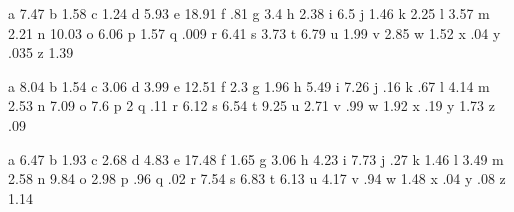 


\startcharactertable[nl]
  \charfreq a  7.47
  \charfreq b  1.58
  \charfreq c  1.24
  \charfreq d  5.93
  \charfreq e 18.91
  \charfreq f   .81
  \charfreq g  3.4
  \charfreq h  2.38
  \charfreq i  6.5
  \charfreq j  1.46
  \charfreq k  2.25
  \charfreq l  3.57
  \charfreq m  2.21
  \charfreq n 10.03
  \charfreq o  6.06
  \charfreq p  1.57
  \charfreq q   .009
  \charfreq r  6.41
  \charfreq s  3.73
  \charfreq t  6.79
  \charfreq u  1.99
  \charfreq v  2.85
  \charfreq w  1.52
  \charfreq x   .04
  \charfreq y   .035
  \charfreq z  1.39
\stopcharactertable




\startcharactertable[en]
  \charfreq a  8.04
  \charfreq b  1.54
  \charfreq c  3.06
  \charfreq d  3.99
  \charfreq e 12.51
  \charfreq f  2.3
  \charfreq g  1.96
  \charfreq h  5.49
  \charfreq i  7.26
  \charfreq j   .16
  \charfreq k   .67
  \charfreq l  4.14
  \charfreq m  2.53
  \charfreq n  7.09
  \charfreq o  7.6
  \charfreq p  2
  \charfreq q   .11
  \charfreq r  6.12
  \charfreq s  6.54
  \charfreq t  9.25
  \charfreq u  2.71
  \charfreq v   .99
  \charfreq w  1.92
  \charfreq x   .19
  \charfreq y  1.73
  \charfreq z   .09
\stopcharactertable


\startcharactertable[de]
  \charfreq a  6.47
  \charfreq b  1.93
  \charfreq c  2.68
  \charfreq d  4.83
  \charfreq e 17.48
  \charfreq f  1.65
  \charfreq g  3.06
  \charfreq h  4.23
  \charfreq i  7.73
  \charfreq j   .27
  \charfreq k  1.46
  \charfreq l  3.49
  \charfreq m  2.58
  \charfreq n  9.84
  \charfreq o  2.98
  \charfreq p   .96
  \charfreq q   .02
  \charfreq r  7.54
  \charfreq s  6.83
  \charfreq t  6.13
  \charfreq u  4.17
  \charfreq v   .94
  \charfreq w  1.48
  \charfreq x   .04
  \charfreq y   .08
  \charfreq z  1.14
\stopcharactertable

\endinput

